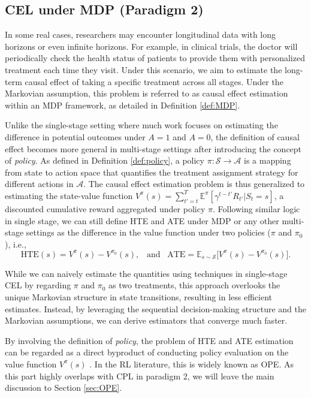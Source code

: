 \subsection{\acrshort{CEL} under \acrshort{MDP} (Paradigm 2)}
In some real cases, researchers may encounter longitudinal data with long horizons or even infinite horizons. For example, in clinical trials, the doctor will periodically check the health status of patients to provide them with personalized treatment each time they visit. Under this scenario, we aim to estimate the long-term causal effect of taking a specific treatment across all stages. 
Under the Markovian assumption, this problem is referred to as causal effect estimation within an \acrshort{MDP} framework, as detailed in Definition \ref{def:MDP}. 

Unlike the single-stage setting where much work focuses on estimating the difference in potential outcomes under $A = 1$ and $A=0$, the definition of causal effect becomes more general in multi-stage settings after introducing the concept of \textit{policy}. As defined in Definition \ref{def:policy}, a policy $\pi: \mathcal{S}\rightarrow \mathcal{A}$ is a mapping from state to action space that quantifies the treatment assignment strategy for different actions in $\mathcal{A}$. 
The causal effect estimation problem is thus generalized to estimating the state-value function $V^{\pi}(s) = \sum_{t'=t}^T \mathbb{E}^{\pi}[\gamma^{t-t'}R_{t'}|S_t = s]$, a discounted cumulative reward aggregated under policy $\pi$. Following similar logic in single stage, we can still define  \acrshort{HTE} and \acrshort{ATE} under \acrshort{MDP} or any other multi-stage settings as the difference in the value function under two policies ($\pi$ and $\pi_0$), i.e.,
\begin{equation*}
    \text{HTE}(s) = V^{\pi}(s) -  V^{\pi_0}(s), \;\;\; \text{and} \;\;\;
    \text{ATE} =\mathbb{E}_{s\sim \mathcal{S}}\Big[ V^{\pi}(s) -  V^{\pi_0}(s) \Big].
\end{equation*}


While we can naively estimate the quantities using techniques in single-stage \acrshort{CEL} by regarding $\pi$ and $\pi_0$ as two treatments, this approach overlooks the unique Markovian structure in state transitions, resulting in less efficient estimates.
Instead, by leveraging the sequential decision-making structure and the Markovian assumptions, we can derive estimators that converge much faster. 

By involving the definition of \textit{policy}, the problem of \acrshort{HTE} and \acrshort{ATE} estimation can be regarded as a direct byproduct of conducting policy evaluation on the value function $V^{\pi}(s)$ \citep{tang2022reinforcement,shi2023dynamic}.
In the RL literature, this is widely known as \acrfull{OPE}. As this part highly overlaps with \acrshort{CPL} in paradigm 2, we will leave the main discussion to Section \ref{sec:OPE}.

